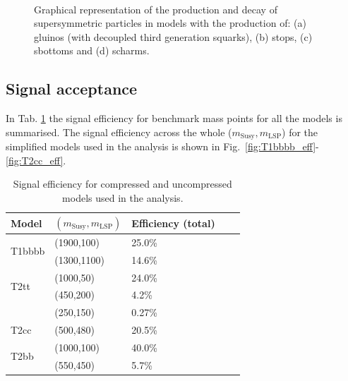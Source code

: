 \begin{figure}[h!]
\begin{center}
{            \label{fig:T2cc_feyn}
            } ~~
        \caption{Graphical representation of the production and decay of
            supersymmetric particles in models with the production of: (a)
            gluinos (with decoupled third generation squarks), (b) stops, (c)
            sbottoms and (d) scharms.}
        \label{fig:simplified-models-feyn}
    \end{center}
\end{figure}

\subsection{Signal acceptance}
\label{sec:sig-accept-contam}
In Tab. \ref{tab:sig-eff} the signal efficiency for benchmark mass points for
all the models is summarised. The signal efficiency across the whole
($m_{\mathrm{Susy}},m_{\mathrm{LSP}}$) for the simplified models used in the
analysis is shown in Fig.~\ref{fig:T1bbbb_eff}-\ref{fig:T2cc_eff}.

\begin{table}[h!]
    \caption{Signal efficiency for compressed and uncompressed models used in
        the analysis.}
    \label{tab:sig-eff}
    \centering
    \begin{tabular}{ lllll }
        \hline \hline
        Model & $(m_{\mathrm{Susy}},m_{\mathrm{LSP}})$ & Efficiency (total) \\ 
        \hline
        \multirow{2}{*}{T1bbbb}
            & (1900,100)  & 25.0\% \\
            & (1300,1100) & 14.6\% \\
        \hline
        \multirow{2}{*}{T2tt}
            & (1000,50) & 24.0\% \\
            & (450,200) & 4.2\% \\
            & (250,150) & 0.27\% \\
        \hline
        T2cc
            & (500,480) & 20.5\% \\
        \hline
        \multirow{2}{*}{T2bb}
            & (1000,100) & 40.0\% \\
            & (550,450)  & 5.7\% \\
        \hline \hline
    \end{tabular}
\end{table}

